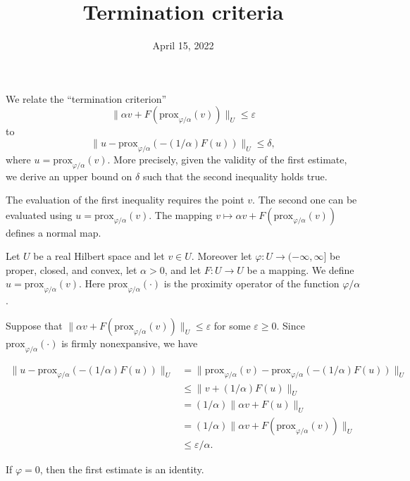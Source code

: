 \documentclass{scrartcl}
\title{Termination criteria}
\date{April 15, 2022}
\newcommand{\prox}[3][]{\mathrm{prox}_{#2}(#3)}
\newcommand{\norm}[2][2]{\|#2\|_{#1}}
\begin{document}
\maketitle

We relate the ``termination criterion'' 
$$\norm[U]{\alpha v + F(\prox{\varphi/\alpha}{v})} \leq \varepsilon$$
to 
$$\norm[U]{u-\prox{\varphi/\alpha}{-(1/\alpha)F(u)}} \leq \delta,$$
where $u = \prox{\varphi/\alpha}{v}$.
More precisely, given the validity of the first estimate, we derive
an upper bound on $\delta$ such that the second inequality holds true.

The evaluation of the first inequality requires the point $v$. The second one
can be evaluated using $u = \prox{\varphi/\alpha}{v}$.
The mapping  $v \mapsto \alpha v+F(\prox{\varphi/\alpha}{v})$ 
defines a normal map.


Let $U$ be a real Hilbert space 
and let $v \in U$. Moreover let $\varphi : U \to (-\infty,\infty]$ 
be proper, closed, and convex, let
$\alpha > 0$, and let $F : U \to U$ be a mapping.
We define $u = \prox{\varphi/\alpha}{v}$.
Here $\prox{\varphi/\alpha}{\cdot}$ is the proximity operator of
the function $\varphi/\alpha$.

Suppose that $\norm[U]{\alpha v + F(\prox{\varphi/\alpha}{v})} \leq \varepsilon$
for some $\varepsilon \geq 0$. Since $\prox{\varphi/\alpha}{\cdot}$ is
firmly nonexpansive, we have


\begin{align*}
	\norm[U]{u-\prox{\varphi/\alpha}{-(1/\alpha)F(u)}}
	& = 
	\norm[U]{\prox{\varphi/\alpha}{v}-\prox{\varphi/\alpha}{-(1/\alpha)F(u)}}
	\\
	& \leq
	\norm[U]{v+(1/\alpha)F(u)}
	\\
	& = (1/\alpha)\norm[U]{\alpha v+ F(u)}
	\\
	& = (1/\alpha)\norm[U]{\alpha v+ F(\prox{\varphi/\alpha}{v})}
	\\
	& \leq \varepsilon/\alpha.
\end{align*}

If $\varphi = 0$, then the first estimate is an identity.
\end{document}
